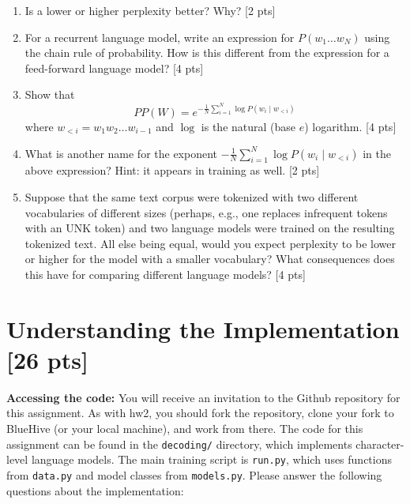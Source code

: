\documentclass[11pt]{article}
\begin{document}
\begin{enumerate}[label=\alph*., itemsep=2em]
  \item Is a lower or higher perplexity better? Why? [2 pts]
  \item For a recurrent language model, write an expression for $P(w_1 \dots w_N)$ using the chain rule of probability.  How is this different from the expression for a feed-forward language model? [4 pts]
  \item Show that
  \[ PP(W) = e^{-\frac{1}{N} \sum_{i=1}^N \log P(w_i \mid w_{<i})} \]
  where $w_{<i} = w_1 w_2 \dots w_{i-1}$ and $\log$ is the natural (base $e$) logarithm. [4 pts]
  \item What is another name for the exponent $-\frac{1}{N} \sum_{i=1}^N \log P(w_i \mid w_{<i})$ in the above expression? Hint: it appears in training as well. [2 pts]
  \item Suppose that the same text corpus were tokenized with two different vocabularies of different sizes (perhaps, e.g., one replaces infrequent tokens with an UNK token) and two language models were trained on the resulting tokenized text.  All else being equal, would you expect perplexity to be lower or higher for the model with a smaller vocabulary?  What consequences does this have for comparing different language models? [4 pts]
\end{enumerate}

\vspace{2em}
\section{Understanding the Implementation [26 pts]}

\noindent \textbf{Accessing the code:} You will receive an invitation to the Github repository for this assignment. As with hw2, you should fork the repository, clone your fork to BlueHive (or your local machine), and work from there. The code for this assignment can be found in the \texttt{decoding/} directory, which implements character-level language models. The main training script is \texttt{run.py}, which uses functions from \texttt{data.py} and model classes from \texttt{models.py}. Please answer the following questions about the implementation:
\end{document}
